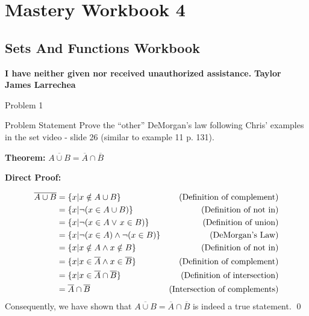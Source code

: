 \clearpage
\chapter{Mastery Workbook 4}

\section{Sets And Functions Workbook}


\begin{center}
    \Large{\textbf{I have neither given nor received unauthorized assistance.}}
    \large{\textbf{Taylor James Larrechea}}
\end{center}

\begin{problem}{Problem 1}
    \begin{statement}{Problem Statement}
        Prove the “other” DeMorgan’s law following Chris’ examples in the set video - slide 26 (similar to example 11 p. 131).
    \end{statement}

    \begin{Highlight}[Solution]
        \noindent \textbf{Theorem:} $\overline{A \cup B} = \overline{A} \cap \overline{B}$ \vspace*{1em}

        \noindent \textbf{Direct Proof:}

        \begin{align*}
            \overline{A \cup B} & = \{x | x \notin A \cup B \} & \text{(Definition of complement)} \\
            & = \{x | \neg (x \in A \cup B) \} & \text{(Definition of not in)} \\
            & = \{x | \neg (x \in A \vee \hspace*{1pt} x \in B)\} & \text{(Definition of union)} \\
            & = \{x | \neg (x \in A) \wedge \neg (x \in B) \} & \text{(DeMorgan’s Law)} \\
            & = \{x | x \notin A \wedge x \notin B \} & \text{(Definition of not in)} \\
            & = \{x | x \in \overline{A} \wedge x \in \overline{B} \} & \text{(Definition of complement)} \\
            & = \{x | x \in \overline{A} \cap \overline{B} \} & \text{(Definition of intersection)} \\
            & = \overline{A} \cap \overline{B} & \text{(Intersection of complements)}
        \end{align*}
        Consequently, we have shown that $\overline{A \cup B} = \overline{A} \cap \overline{B}$ is indeed a true statement. \qed
    \end{Highlight}
\end{problem}

